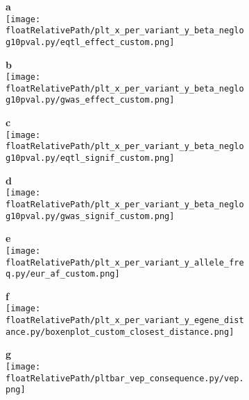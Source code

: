 \begin{figure}[!ht]

    \begin{subfigure}[]{.49\textwidth}
        \textbf{a}
        \\
        \texttt{[image: \\floatRelativePath/plt\_x\_per\_variant\_y\_beta\_neglog10pval.py/eqtl\_effect\_custom.png]}
    \end{subfigure}
    \begin{subfigure}[]{.49\textwidth}
        \textbf{b}
        \\
        \texttt{[image: \\floatRelativePath/plt\_x\_per\_variant\_y\_beta\_neglog10pval.py/gwas\_effect\_custom.png]}
    \end{subfigure}

    \begin{subfigure}[]{.49\textwidth}
        \textbf{c}
        \\
        \texttt{[image: \\floatRelativePath/plt\_x\_per\_variant\_y\_beta\_neglog10pval.py/eqtl\_signif\_custom.png]}
    \end{subfigure}
    \begin{subfigure}[]{.49\textwidth}
        \textbf{d}
        \\
        \texttt{[image: \\floatRelativePath/plt\_x\_per\_variant\_y\_beta\_neglog10pval.py/gwas\_signif\_custom.png]}
    \end{subfigure}

    \centering
    \begin{subfigure}[]{.49\textwidth}
        \textbf{e}
        \\
        \texttt{[image: \\floatRelativePath/plt\_x\_per\_variant\_y\_allele\_freq.py/eur\_af\_custom.png]}
    \end{subfigure}
    \begin{subfigure}[]{.49\textwidth}
        \textbf{f}
        \\
        \texttt{[image: \\floatRelativePath/plt\_x\_per\_variant\_y\_egene\_distance.py/boxenplot\_custom\_closest\_distance.png]}
    \end{subfigure}

    \begin{subfigure}[]{.49\textwidth}
        \textbf{g}
        \\
        \texttt{[image: \\floatRelativePath/pltbar\_vep\_consequence.py/vep.png]}
    \end{subfigure}

    \caption{}

\end{figure}

